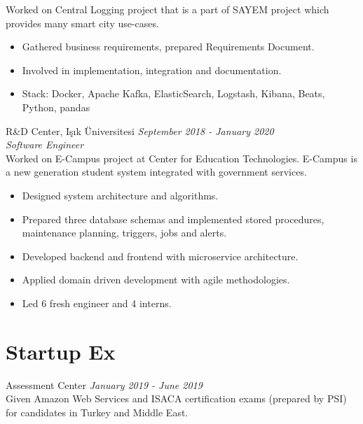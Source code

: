 \documentclass[margin, 10pt]{res} %
\begin{document}
\begin{resume}
Worked on Central Logging project that is a part of SAYEM project which provides many smart city use-cases. 
\begin{itemize} 
\item Gathered business requirements, prepared Requirements Document.
\item Involved in implementation, integration and documentation.
\item Stack: Docker, Apache Kafka, ElasticSearch, Logstash, Kibana, Beats, Python, pandas
\end{itemize} 

R\&D Center, Işık Üniversitesi \hfill \textit{September 2018 - January 2020} \\
{\sl Software Engineer} \\
Worked on E-Campus project at Center for Education Technologies. E-Campus is a new generation student system integrated with government services.
\begin{itemize}
\item Designed system architecture and algorithms.
\item Prepared three database schemas and implemented stored procedures, maintenance planning, triggers, jobs and alerts.
\item Developed backend and frontend with microservice architecture.
\item Applied domain driven development with agile methodologies.
\item  Led 6 fresh engineer and 4 interns.
\end{itemize} 


\section{Startup Ex}

Assessment Center \hfill \textit{January 2019 - June 2019} \\
Given Amazon Web Services and ISACA certification exams (prepared by PSI) for candidates in Turkey and Middle East. 



\end{resume}
\end{document}
